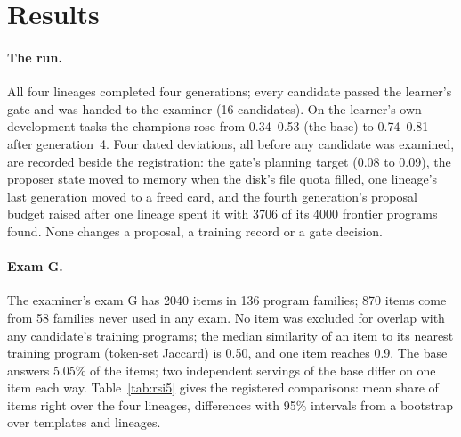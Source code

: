\section{Results}\label{sec:results}

\paragraph{The run.} All four lineages completed four generations; every candidate passed the learner's gate and was handed to
the examiner (16 candidates). On the learner's own development tasks the champions rose from 0.34--0.53 (the base) to
0.74--0.81 after generation~4. Four dated deviations, all before any candidate was examined, are recorded beside the
registration: the gate's planning target (0.08 to 0.09), the proposer state moved to memory when the disk's file quota filled,
one lineage's last generation moved to a freed card, and the fourth generation's proposal budget raised after one lineage
spent it with 3706 of its 4000 frontier programs found. None changes a proposal, a training record or a gate decision.

\paragraph{Exam G.} The examiner's exam G has 2040 items in 136 program families; 870 items come from 58 families never used
in any exam. No item was excluded for overlap with any candidate's training programs; the median similarity of an item to its
nearest training program (token-set Jaccard) is 0.50, and one item reaches 0.9. The base answers 5.05\% of the items; two
independent servings of the base differ on one item each way. Table~\ref{tab:rsi5} gives the registered comparisons: mean share
of items right over the four lineages, differences with 95\% intervals from a bootstrap over templates and lineages.

